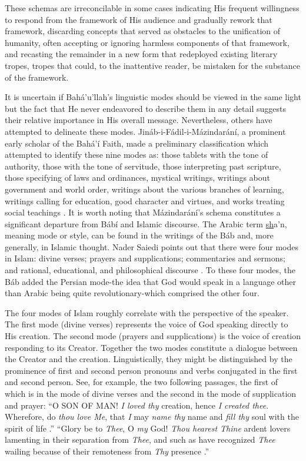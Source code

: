 \documentclass[12pt, oneside]{report}
\begin{document}
These schemas are irreconcilable in some cases indicating His frequent willingness to respond from the framework of His audience and gradually rework that framework, discarding concepts that served as obstacles to the unification of humanity, often accepting or ignoring harmless components of that framework, and recasting the remainder in a new form that redeployed existing literary tropes, tropes that could, to the inattentive reader, be mistaken for the substance of the framework.
\par
It is uncertain if Bah\'{a}'u'llah's linguistic modes should be viewed in the same light but the fact that He never endeavored to describe them in any detail suggests their relative importance in His overall message.
Nevertheless, others have attempted to delineate these modes.
Jin\'{a}b-i-F\'{a}dil-i-M\'{a}zindar\'{a}n\'{i}, a prominent early scholar of the Bah\'{a}'\'{i} Faith, made a preliminary classification which attempted to identify these nine modes as: those tablets with the tone of authority, those with the tone of servitude, those interpreting past scripture, those specifying of laws and ordinances, mystical writings, writings about government and world order, writings about the various branches of learning, writings calling for education, good character and virtues, and works treating social teachings \cite{}.
It is worth noting that M\'{a}zindar\'{a}n\'{i}'s schema constitutes a significant departure from B\'{a}b\'{i} and Islamic discourse. The Arabic term \underline{sh}a'n, meaning mode or style, can be found in the writings of the B\'{a}b and, more generally, in Islamic thought.
Nader Saiedi points out that there were four modes in Islam: divine verses; prayers and supplications; commentaries and sermons; and rational, educational, and philosophical discourse \cite{saiedi_gate_2008}.
To these four modes, the B\'{a}b added the Persian mode-the idea that God would speak in a language other than Arabic being quite revolutionary-which comprised the other four.
\par
The four modes of Islam roughly correlate with the perspective of the speaker.
The first mode (divine verses) represents the voice of God speaking directly to His creation.
The second mode (prayers and supplications) is the voice of creation responding to its Creator.
Together the two modes constitute a dialogue between the Creator and the creation.
Linguistically, they might be distinguished by the prominence of first and second person pronouns and verbs conjugated in the first and second person.
See, for example, the two following passages, the first of which is in the mode of divine verses and the second in the mode of supplication and prayer: ``O SON OF MAN! \emph{I loved thy} creation, hence \emph{I created thee}. Wherefore, do \emph{thou love Me}, that \emph{I} may \emph{name thy} name and \emph{fill thy} soul with the spirit of life \cite{bahaullah_hidden_2002}.'' ``Glory be to \emph{Thee}, O \emph{my} God!  \emph{Thou hearest Thine} ardent lovers lamenting in their separation from \emph{Thee}, and such as have recognized \emph{Thee} wailing because of their remoteness from \emph{Thy} presence \cite{}.''
\end{document}
